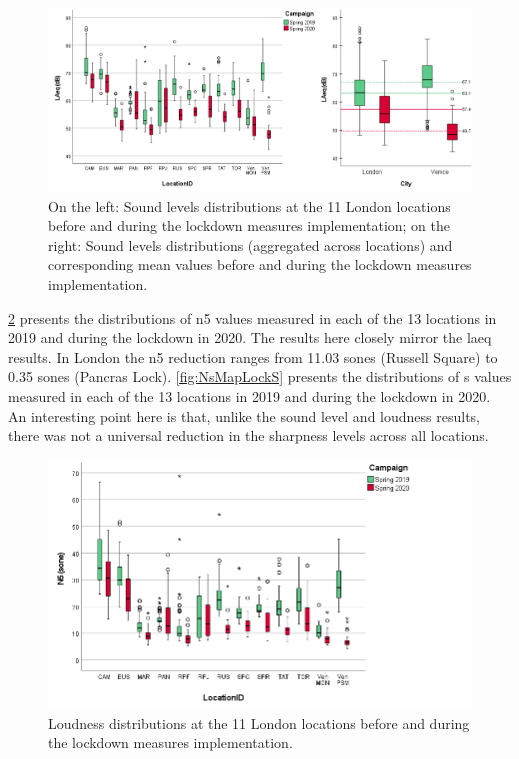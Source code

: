 \begin{figure}[h]
  \centering
  \includegraphics[width=\textwidth]{Figures/LockdownLAeqCombined.png}
  \caption{On the left: Sound levels distributions at the 11 London locations before and during the lockdown measures implementation; on the right: Sound levels distributions (aggregated across locations) and corresponding mean values before and during the lockdown measures implementation. \label{fig:NsMapLockLAeq}}


\end{figure}

\cref{fig:NsMapLockN5} presents the distributions of \gls{n5} values measured in each of the 13 locations in 2019 and during the lockdown in 2020. The results here closely mirror the \gls{laeq} results. In London the \gls{n5} reduction ranges from 11.03 sones (Russell Square) to 0.35 sones (Pancras Lock). \cref{fig:NsMapLockS} presents the distributions of \gls{s} values measured in each of the 13 locations in 2019 and during the lockdown in 2020. An interesting point here is that, unlike the sound level and loudness results, there was not a universal reduction in the sharpness levels across all locations.

\begin{figure}[h]
  \centering
  \includegraphics[width=\textwidth]{Figures/LockdownLoudness.png}
  \caption{Loudness distributions at the 11 London locations before and during the lockdown measures implementation. \label{fig:NsMapLockN5}}

\end{figure}

